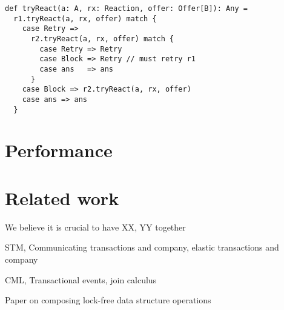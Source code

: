\documentclass[preprint]{sigplanconf}
\begin{document}
\begin{lstlisting}
def tryReact(a: A, rx: Reaction, offer: Offer[B]): Any = 
  r1.tryReact(a, rx, offer) match {
    case Retry => 
      r2.tryReact(a, rx, offer) match {
        case Retry => Retry
        case Block => Retry // must retry r1
        case ans   => ans
      }
    case Block => r2.tryReact(a, rx, offer)
    case ans => ans
  }
\end{lstlisting}

\section{Performance}
\label{sec:performance}



\section{Related work}
\label{sec:related}

We believe it is crucial to have XX, YY together

STM, Communicating transactions and company, elastic transactions and company

CML, Transactional events, join calculus

Paper on composing lock-free data structure operations



\end{document}
